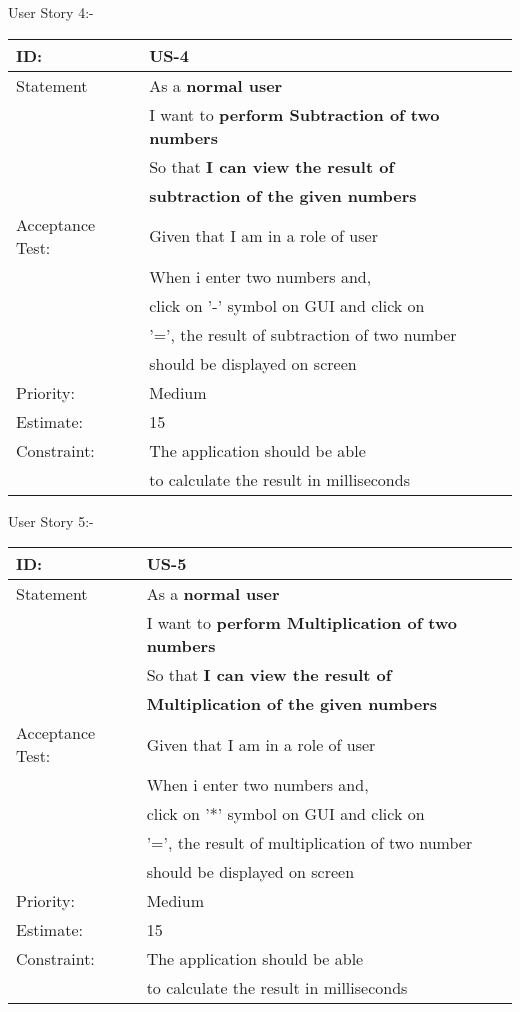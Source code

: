 \documentclass[12pt,a4paper]{article}
\begin{document}
\newpage
User Story 4:-
\begin{table}[h]
\centering
\begin{tabular}{|l|l|}
\hline
ID: & US-4 \\
\hline
Statement & As a \textbf{normal user} \\& I want to \textbf{perform Subtraction of two numbers }  \\ &So that \textbf{I can view the result of }\\& \textbf{subtraction of the given numbers }\\
\hline
Acceptance Test: & Given that I am in a role of user\\
& When i enter two numbers and,\\& click on '-' symbol on GUI and click on \\
& '=', the result of subtraction of two number \\& should be displayed on screen\\
\hline
Priority: & Medium \\
\hline
Estimate: & 15\\
\hline
Constraint: & The application should be able  \\& to calculate the result in milliseconds\\
\hline
\end{tabular}
\end{table}
\newpage
User Story 5:-
\begin{table}[h]
\centering
\begin{tabular}{|l|l|}
\hline
ID: & US-5 \\
\hline
Statement & As a \textbf{normal user} \\& I want to \textbf{perform Multiplication of two numbers }  \\ &So that \textbf{I can view the result of }\\& \textbf{Multiplication of the given numbers }\\
\hline
Acceptance Test: & Given that I am in a role of user\\
& When i enter two numbers and,\\& click on '*' symbol on GUI and click on \\
& '=', the result of multiplication of two number \\& should be displayed on screen\\
\hline
Priority: & Medium \\
\hline
Estimate: & 15\\
\hline
Constraint: & The application should be able  \\& to calculate the result in milliseconds\\
\hline
\end{tabular}
\end{table}
\end{document}
